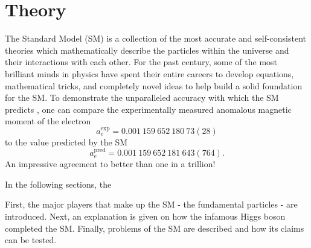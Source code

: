 \chapter{Theory}
\label{ch:theory}

The Standard Model (SM) is a collection of the most accurate and self-consistent theories which mathematically describe the particles within the universe and their interactions with each other.
For the past century, some of the most brilliant minds in physics have spent their entire careers to develop equations, mathematical tricks, and completely novel ideas to help build a solid foundation for the SM.
To demonstrate the unparalleled accuracy with which the SM predicts , one can compare the experimentally measured anomalous magnetic moment of the electron
\begin{equation*}
    a_e^{\mathrm{exp}} = 0.001\ 159\ 652\ 180\ 73(28)
\end{equation*}
to the value predicted by the SM
\begin{equation*}
    a_e^{\mathrm{pred}} = 0.001\ 159\ 652\ 181\ 643(764).
\end{equation*}
An impressive agreement to better than one in a trillion!

In the following sections, the


First, the major players that make up the SM - the fundamental particles - are introduced.
Next, an explanation is given on how the infamous Higgs boson completed the SM.
Finally, problems of the SM are described and how its claims can be tested.



